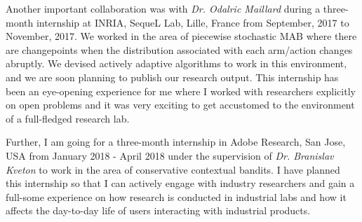 \documentclass[twoside]{article}
\begin{document}
    Another important collaboration was with \textit{Dr. Odalric Maillard} during a three-month internship at INRIA, SequeL Lab, Lille, France from September, 2017 to November, 2017. We worked in the area of piecewise stochastic MAB where there are changepoints when the distribution associated with each arm/action changes abruptly. We devised actively adaptive algorithms to work in this environment, and we are soon planning to publish our research output. This internship has been an eye-opening experience for me where I worked with researchers explicitly on open problems and it was very exciting to get accustomed to the environment of a full-fledged research lab. 
    
    Further, I am going for a three-month internship in Adobe Research, San Jose, USA from January 2018 - April 2018 under the supervision of \textit{Dr. Branislav Kveton} to work in the area of conservative contextual bandits. I have planned this internship so that I can actively engage with industry researchers and gain a full-some experience on how research is conducted in industrial labs and how it affects the day-to-day life of users interacting with industrial products. 


\end{document}
